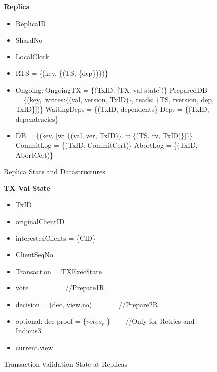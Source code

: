 \newcommand{\SubItem}[1]{
    {\setlength\itemindent{15pt} \item[-] #1}
}

\begin{figure}[t]
  \begin{mdframed}[roundcorner=10pt]
 	\textbf{Replica }
 	\begin{itemize}
 	\item ReplicaID
 	\item ShardNo
 	\item LocalClock
 	\item RTS = \{(key, \{(TS, \{dep\})\})\}
 	\item Ongoing:
 	\subitem OngoingTX = \{(TxID, [TX, val state])\}
 	\subitem PreparedDB = \{(key, [writes:\{(val, version, TxID)\},  reads: \{TS, rversion, dep, TxID\}])\}
 	\subitem WaitingDeps = \{(TxID, dependents\}
 	\subitem Deps = \{(TxID, dependencies\}
 	\item DB = \{(key, [w: \{(val, ver, TxID)\}, r: \{(TS, rv, TxID)\}])\}
 	\subitem CommitLog = \{(TxID, CommitCert)\}
 	\subitem AbortLog = \{(TxID, AbortCert)\}
	 	
 	
 	\end{itemize}
  \end{mdframed}
  \caption{Replica State and Datastructures}
  \label{fig:RS}
\end{figure}


\begin{figure}[t]
  \begin{mdframed}[roundcorner=10pt]
 	\textbf{TX Val State}
 	\begin{itemize}
 	\item TxID
 	\item originalClientID
 	\item interestedClients = \{CID\}
 	\item ClientSeqNo
 	\item Transaction = TXExecState
 	\item vote   ~~~~~~~~~~//Prepare1R
 	\item decision = (dec, view.no) ~~~~~~~//Prepare2R
 	\item optional: dec proof = \{$votes_r$ \} ~~~ //Only for Retries and Indicus3
 	\item current.view
 	\end{itemize}
  \end{mdframed}
  \caption{Transaction Validation State at Replicas}
  \label{fig:TX}
\end{figure}

